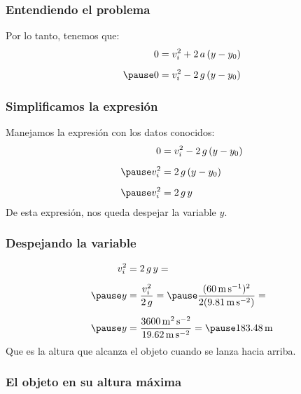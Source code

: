 \documentclass[14pt]{beamer}
\begin{document}
\begin{frame}
\frametitle{Entendiendo el problema}
Por lo tanto, tenemos que:
\pause
\begin{eqnarray*}
\begin{aligned}
0 &= v_{i}^{2} + 2 \, a \, (y - y_{0}) \\[0.5em] \pause
0 &= v_{i}^{2} - 2 \, g \, (y - y_{0})
\end{aligned}
\end{eqnarray*}
\end{frame}
\begin{frame}
\frametitle{Simplificamos la expresión}
Manejamos la expresión con los datos conocidos:
\pause
\begin{eqnarray*}
\begin{aligned}
0 &= v_{i}^{2} - 2 \, g \, (y - y_{0}) \\[0.5em] \pause 
v_{i}^{2} &= 2 \, g \, (y - y_{0}) \\[0.5em] \pause
v_{i}^{2} &= 2 \, g \, y
\end{aligned}
\end{eqnarray*}
\pause
De esta expresión, nos queda despejar la variable $y$.
\end{frame}
\begin{frame}
\frametitle{Despejando la variable}
\begin{eqnarray*}
\begin{aligned}
v_{i}^{2} &= 2 \, g \, y = \\[0.5em] \pause
y &= \dfrac{v_{i}^{2}}{2 \, g} = \pause \dfrac{(\SI{60}{\meter\per\second})^{2}}{2 (\SI{9.81}{\meter\per\square\second})} = \\[0.5em] \pause
y &= \dfrac{\SI{3600}{\square\meter\per\square\second}}{\SI{19.62}{\meter\per\square\second}} = \pause \SI{183.48}{\meter}
\end{aligned}
\end{eqnarray*}
\pause
Que es la altura que alcanza el objeto cuando se lanza hacia arriba.
\end{frame}
\begin{frame}
\frametitle{El objeto en su altura máxima}
\begin{figure}
    \centering
\end{figure}
\end{frame}
\end{document}
